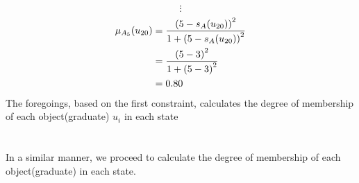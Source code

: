 \documentclass[a4paper]{book}
\begin{document}
				\[
					\vdots
				\]
				\begin{align}
					\mu_{A_5}(u_{20}) &= \frac{\left(5-s_A(u_{20})\right)^2}{1 + \left(5-s_A(u_{20})\right)^2}\\
					&= \frac{\left(5-3\right)^2}{1 + \left(5-3\right)^2} \notag \\
					&= 0.80 \notag
				\end{align}
			The foregoings, based on the first constraint, calculates the degree of membership of each object(graduate) $u_i$ in each state
			\\
			\\
			\\
			In a similar manner, we proceed to calculate the degree of membership of each object(graduate) in each state.
\end{document}
